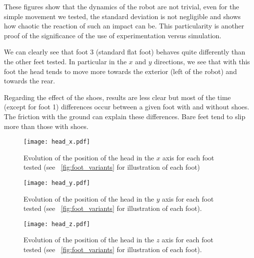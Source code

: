 These figures show that the dynamics of the robot are not trivial, even for the simple movement we tested, the standard deviation is not negligible and shows how chaotic the reaction of such an impact can be. This particularity is another proof of the significance of the use of experimentation versus simulation.

We can clearly see that foot 3 (standard flat foot) behaves quite differently than the other feet tested. In particular in the $x$ and $y$ directions, we see that with this foot the head tends to move more towards the exterior (left of the robot) and towards the rear.

Regarding the effect of the shoes, results are less clear but most of the time (except for foot 1) differences occur between a given foot with and without shoes. The friction with the ground can explain these differences. Bare feet tend to slip more than those with shoes.


\begin{figure}[ht]
    \begin{center}
        \texttt{[image: head\_x.pdf]}
    \end{center}
    \caption{Evolution of the position of the head in the $x$ axis for
    each foot tested (see \figurename~\ref{fig:foot_variants} for illustration of each foot)}
    \label{fig:head_x}
\end{figure}

\begin{figure}[ht]
    \begin{center}
        \texttt{[image: head\_y.pdf]}
    \end{center}
    \caption{Evolution of the position of the head in the $y$ axis for
    each foot tested (see \figurename~\ref{fig:foot_variants} for illustration of each foot).}
    \label{fig:head_y}
\end{figure}

\begin{figure}[ht]
    \begin{center}
        \texttt{[image: head\_z.pdf]}
    \end{center}
    \caption{Evolution of the position of the head in the $z$ axis for
    each foot tested (see \figurename~\ref{fig:foot_variants} for illustration of each foot).}
    \label{fig:head_z}
\end{figure}


